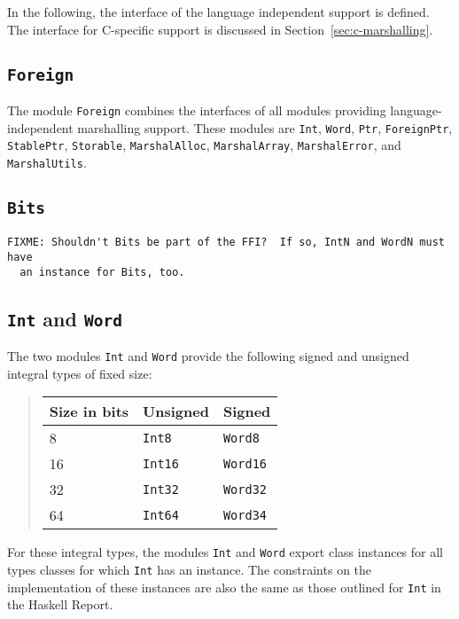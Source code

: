 \documentclass[a4paper,twosides]{article}
\newcommand{\code}[1]{\texttt{#1}}      %
\begin{document}
In the following, the interface of the language independent support is
defined.  The interface for C-specific support is discussed in
Section~\ref{sec:c-marshalling}. 

\subsection{\code{Foreign}}

The module \code{Foreign} combines the interfaces of all modules providing
language-independent marshalling support.  These modules are \code{Int},
\code{Word}, \code{Ptr}, \code{ForeignPtr}, \code{StablePtr}, \code{Storable},
\code{MarshalAlloc}, \code{MarshalArray}, \code{MarshalError}, and
\code{MarshalUtils}.

\subsection{\code{Bits}}

\begin{verbatim}
FIXME: Shouldn't Bits be part of the FFI?  If so, IntN and WordN must have
  an instance for Bits, too.
\end{verbatim}

\subsection{\code{Int} and \code{Word}}

The two modules \code{Int} and \code{Word} provide the following signed and
unsigned integral types of fixed size:
%
\begin{quote}
  \begin{tabular}{|l|l|l|}
    \hline
    Size in bits & Unsigned     & Signed\\\hline\hline
    8            & \code{Int8}  & \code{Word8}\\
    16           & \code{Int16} & \code{Word16}\\
    32           & \code{Int32} & \code{Word32}\\
    64           & \code{Int64} & \code{Word34}\\
    \hline
  \end{tabular}
\end{quote}
%
For these integral types, the modules \code{Int} and \code{Word} export class
instances for all types classes for which \code{Int} has an instance.  The
constraints on the implementation of these instances are also the same as
those outlined for \code{Int} in the Haskell Report.
\end{document}
